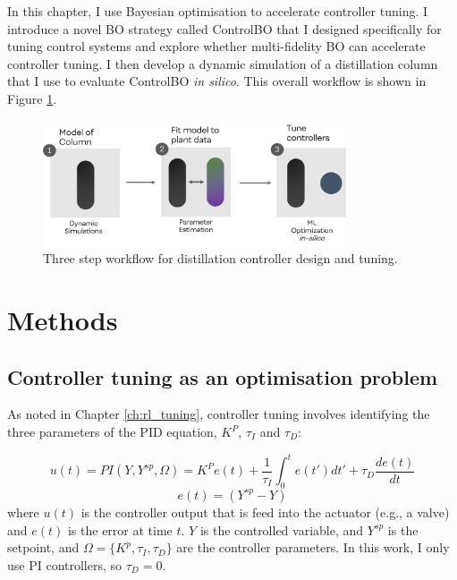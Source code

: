In this chapter, I use Bayesian optimisation to accelerate controller tuning. I introduce a novel BO strategy called ControlBO that I  designed specifically for tuning control systems and explore whether multi-fidelity BO can accelerate controller tuning. I then develop a dynamic simulation of a distillation column that I use to evaluate ControlBO \textit{in silico}. This overall workflow is shown in Figure \ref{fig:tuning_workflow}.

\begin{figure}
    \centering
    \includegraphics[width=0.8\textwidth]{gfx/Chapter06/tuning_workflow.png}
    \caption{Three step workflow for distillation controller design and tuning.}
    \label{fig:tuning_workflow}
\end{figure}

\section{Methods}

\subsection{Controller tuning as an optimisation problem}

As noted in Chapter \ref{ch:rl_tuning}, controller tuning involves identifying the three parameters of the PID equation, $K^P$, $\tau_I$ and $\tau_D$:

\begin{equation}
    u(t) = PI(Y, Y^{sp}, \Omega) =  K^P e(t) + \frac{1}{\tau_I}\int_0^t e(t')dt' + \tau_D \frac{de(t)}{dt}
\end{equation}
\begin{equation}
    e(t) = (Y^{sp} - Y)
\end{equation}
where $u(t)$ is the controller output that is feed into the actuator (e.g., a valve) and $e(t)$ is the error at time $t$. $Y$ is the controlled variable, and $Y^{sp}$ is the setpoint, and $\Omega=\{K^p, \tau_I, \tau_D \}$ are the controller parameters. In this work, I only use PI controllers, so $\tau_D=0$.

